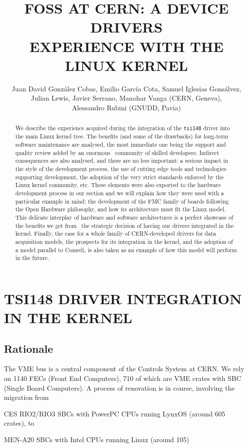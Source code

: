 \documentclass{JAC2003}
\title{FOSS AT CERN: A DEVICE DRIVERS\\
	EXPERIENCE WITH THE LINUX KERNEL}
\author{%
	Juan David Gonz\'alez Cobas, Emilio Garc\'ia Cota,
	Samuel Iglesias Gons\'alvez,\\
	Julian Lewis, Javier Serrano, Manohar Vanga (CERN, Geneva),\\ 
	Alessandro Rubini (GNUDD, Pavia)}
\begin{document}
\maketitle
\begin{abstract}
    We describe the experience acquired during the integration of the
    \texttt{tsi148} driver
    into the main Linux kernel tree. The benefits (and some of the drawbacks) for
    long-term software maintenance are analysed, the most immediate one being the
    support and quality review added by an enormous  community of skilled
    developers. Indirect consequences are also analysed, and these are no less
    important: a serious impact in the style of the development process, the use of
    cutting edge tools and technologies supporting development, the adoption of the
    very strict standards enforced by the Linux kernel community, etc. These
    elements were also exported to the hardware development process in our section
    and we will explain how they were used with a particular example in mind: the
    development of the FMC family of boards following the Open Hardware philosophy,
    and how its architecture must fit the Linux model. This delicate interplay of
    hardware and software architectures is a perfect showcase of the benefits we
    get from  the strategic decision of having our drivers integrated in the
    kernel.  Finally, the case for a whole family of CERN-developed drivers for
    data acquisition models, the prospects for its integration in the kernel, and
    the adoption of a model parallel to Comedi, is also taken as an example of how
    this model will perform in the future.
\end{abstract}


\section{TSI148 DRIVER INTEGRATION IN THE KERNEL}
\subsection{Rationale}
The VME bus is a central component of the Controls System at CERN. We 
rely on 1140 FECs (Front End Computers), 710 of which are VME crates
with SBC (Single Board Computers). A process of renovation is in course,
involving the migration from 
\begin{Itemize}
\item CES RIO2/RIO3 SBCs with PowerPC CPUs runing LynxOS (around 605 crates), to
\item MEN-A20 SBCs with Intel CPUs running Linux (around 105)
\end{Itemize}
\end{document}
